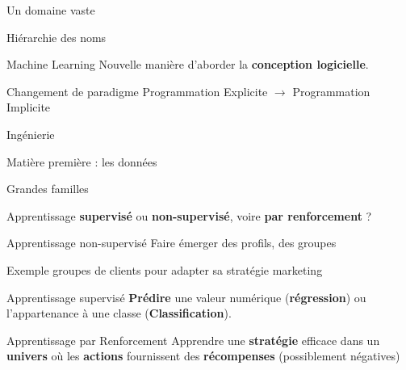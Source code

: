 \begin{frame}{Un domaine vaste}
\end{frame}

\begin{frame}{Hiérarchie des noms}
\end{frame}

\begin{frame}{Machine Learning}
  Nouvelle manière d'aborder la \textbf{conception logicielle}.
  \vfill
  \begin{block}{Changement de paradigme}
  Programmation Explicite $\rightarrow$ Programmation Implicite
  \end{block}
\end{frame}

\begin{frame}{Ingénierie}
\end{frame}

\begin{frame}{Matière première : les données}
\end{frame}

\begin{frame}{Grandes familles}

  Apprentissage \textbf{supervisé} ou \textbf{non-supervisé}, voire \textbf{par renforcement} ?
\end{frame}

\begin{frame}{Apprentissage non-supervisé}
  Faire émerger des profils, des groupes
  \vfill
  \begin{exampleblock}{Exemple}
  groupes de clients pour adapter sa stratégie marketing
  \end{exampleblock}
\end{frame}

\begin{frame}{Apprentissage supervisé}
  \textbf{Prédire} une valeur numérique (\textbf{régression}) ou l'appartenance à une classe (\textbf{Classification}).
\end{frame}

\begin{frame}{Apprentissage par Renforcement}
  Apprendre une \textbf{stratégie} efficace dans un \textbf{univers} où les \textbf{actions} fournissent des \textbf{récompenses} (possiblement négatives)
  \vfill
  \begin{minipage}[l]{0.39\linewidth}
  \end{minipage}
  \begin{minipage}[l]{0.59\linewidth}
  \end{minipage}
\end{frame}

